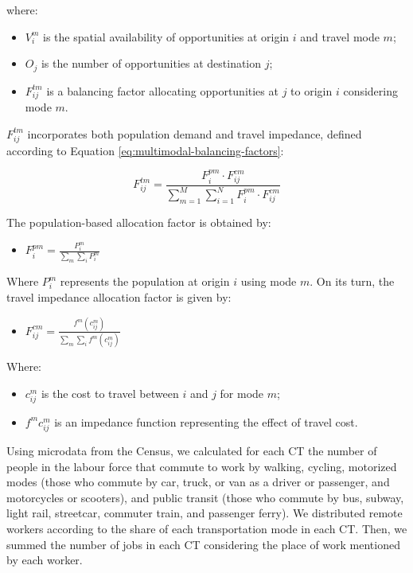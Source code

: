 \documentclass[preprint, 3p,
authoryear]{elsarticle} %
\providecommand{\tightlist}{%
  \setlength{\itemsep}{0pt}\setlength{\parskip}{0pt}}
\begin{document}
where:

\begin{itemize}
\tightlist
\item
  \(V^m_{i}\) is the spatial availability of opportunities at origin
  \(i\) and travel mode \(m\);
\item
  \(O_j\) is the number of opportunities at destination \(j\);
\item
  \(F^{tm}_{ij}\) is a balancing factor allocating opportunities at
  \(j\) to origin \(i\) considering mode \(m\).
\end{itemize}

\(F^{tm}_{ij}\) incorporates both population demand and travel
impedance, defined according to Equation
\ref{eq:multimodal-balancing-factors}:

\begin{equation}
\label{eq:multimodal-balancing-factors}
F^{tm}_{ij} = \frac{F^{pm}_{i} \cdot F^{cm}_{ij}}{\sum_{m=1}^M \sum_{i=1}^N F^{pm}_{i} \cdot F^{cm}_{ij}}
\end{equation}

The population-based allocation factor is obtained by:

\begin{itemize}
\tightlist
\item
  \(F^{pm}_{i} = \frac{P_{i}^m}{\sum_{m}\sum_{i} P_{i}^m}\)
\end{itemize}

Where \(P_{i}^m\) represents the population at origin \(i\) using mode
\(m\). On its turn, the travel impedance allocation factor is given by:

\begin{itemize}
\tightlist
\item
  \(F_{ij}^{cm} = \frac{f^m(c_{ij}^m)}{\sum_{m} \sum_{i} f^m(c_{ij}^m)}\)
\end{itemize}

Where:

\begin{itemize}
\tightlist
\item
  \(c^m_{ij}\) is the cost to travel between \(i\) and \(j\) for mode
  \(m\);
\item
  \(f^m{c^m_{ij}}\) is an impedance function representing the effect of
  travel cost.
\end{itemize}

Using microdata from the Census, we calculated for each CT the number of
people in the labour force that commute to work by walking, cycling,
motorized modes (those who commute by car, truck, or van as a driver or
passenger, and motorcycles or scooters), and public transit (those who
commute by bus, subway, light rail, streetcar, commuter train, and
passenger ferry). We distributed remote workers according to the share
of each transportation mode in each CT. Then, we summed the number of
jobs in each CT considering the place of work mentioned by each worker.
\end{document}
